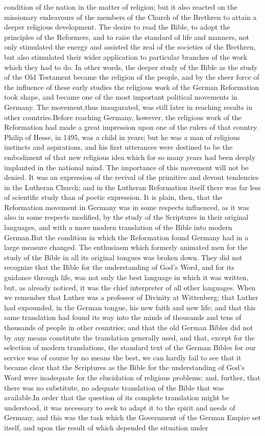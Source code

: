 \documentclass[a4paper]{article}
\begin{document}
condition of the nation in the matter of religion; but it also reacted on the missionary endeavours of the members of the Church of the Brethren to attain a deeper religious development. The desire to read the Bible, to adopt the principles of the Reformers, and to raise the standard of life and manners, not only stimulated the energy and assisted the zeal of the societies of the Brethren, but also stimulated their wider application to particular branches of the work which they had to do. In other words, the deeper study of the Bible as the study of the Old Testament became the religion of the people, and by the sheer force of the influence of these early studies the religious work of the German Reformation took shape, and became one of the most important political movements in Germany. The movement,thus inaugurated, was still later in reaching results in other countries.Before reaching Germany, however, the religious work of the Reformation had made a great impression upon one of the rulers of that country. Philip of Hesse, in 1495, was a child in years; but he was a man of religious instincts and aspirations, and his first utterances were destined to be the embodiment of that new religious idea which for so many years had been deeply implanted in the national mind. The importance of this movement will not be denied. It was an expression of the revival of the primitive and devout tendencies in the Lutheran Church; and in the Lutheran Reformation itself there was far less of scientific study than of poetic expression. It is plain, then, that the Reformation movement in Germany was in some respects influenced, as it was also in some respects modified, by the study of the Scriptures in their original languages, and with a more modern translation of the Bible into modern German.But the condition in which the Reformation found Germany had in a large measure changed. The enthusiasm which formerly animated men for the study of the Bible in all its original tongues was broken down. They did not recognize that the Bible for the understanding of God's Word, and for its guidance through life, was not only the best language in which it was written, but, as already noticed, it was the chief interpreter of all other languages. When we remember that Luther was a professor of Divinity at Wittenberg; that Luther had expounded, in the German tongue, his new faith and new life; and that this same translation had found its way into the minds of thousands and tens of thousands of people in other countries; and that the old German Bibles did not by any means constitute the translation generally used, and that, except for the selection of modern translations, the standard text of the German Bibles for our service was of course by no means the best, we can hardly fail to see that it became clear that the Scriptures as the Bible for the understanding of God's Word were inadequate for the elucidation of religious problems; and, further, that there was no substitute, no adequate translation of the Bible that was available.In order that the question of its complete translation might be understood, it was necessary to seek to adapt it to the spirit and needs of Germany, and this was the task which the Government of the German Empire set itself, and upon the result of which depended the situation under 
\end{document}
